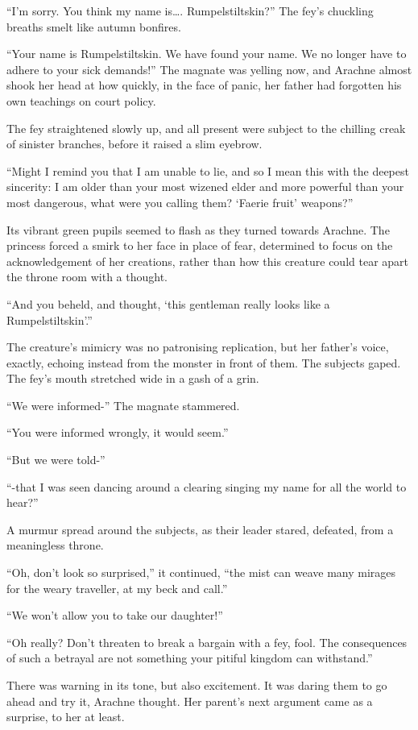 “I’m sorry. You think my name is…. Rumpelstiltskin?” The fey’s chuckling breaths smelt like autumn bonfires. 

“Your name is Rumpelstiltskin. We have found your name. We no longer have to adhere to your sick demands!” The magnate was yelling now, and Arachne almost shook her head at how quickly, in the face of panic, her father had forgotten his own teachings on court policy.

The fey straightened slowly up, and all present were subject to the chilling creak of sinister branches, before it raised a slim eyebrow. 

“Might I remind you that I am unable to lie, and so I mean this with the deepest sincerity: I am older than your most wizened elder and more powerful than your most dangerous, what were you calling them? ‘Faerie fruit’ weapons?”

Its vibrant green pupils seemed to flash as they turned towards Arachne. The princess forced a smirk to her face in place of fear, determined to focus on the acknowledgement of her creations, rather than how this creature could tear apart the throne room with a thought. 

“And you beheld, and thought, ‘this gentleman really looks like a Rumpelstiltskin’.” 

The creature’s mimicry was no patronising replication, but her father’s voice, exactly, echoing instead from the monster in front of them. The subjects gaped. The fey’s mouth stretched wide in a gash of a grin. 

“We were informed-” The magnate stammered.

“You were informed wrongly, it would seem.”

“But we were told-”

“-that I was seen dancing around a clearing singing my name for all the world to hear?”

A murmur spread around the subjects, as their leader stared, defeated, from a meaningless throne.

“Oh, don’t look so surprised,” it continued, “the mist can weave many mirages for the weary traveller, at my beck and call.”

“We won’t allow you to take our daughter!”

“Oh really? Don’t threaten to break a bargain with a fey, fool. The consequences of such a betrayal are not something your pitiful kingdom can withstand.” 

There was warning in its tone, but also excitement. It was daring them to go ahead and try it, Arachne thought. Her parent’s next argument came as a surprise, to her at least.

